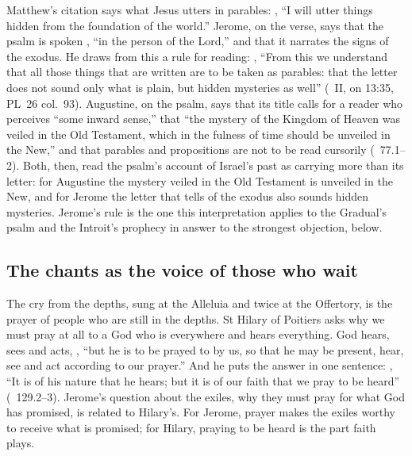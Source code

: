 Matthew's citation says what Jesus utters in parables: , ``I will utter things hidden from the foundation of
the world.'' Jerome, on the verse, says that the psalm is spoken , ``in the person of the Lord,'' and that it narrates the signs
of the exodus. He draws from this a rule for reading: , ``From this
we understand that all those things that are written are to be taken as
parables: that the letter does not sound only what is plain, but hidden
mysteries as well'' (~II, on 13:35, PL~26 col.~93).
Augustine, on the psalm, says that its title calls for a reader who perceives ``some inward sense,''
that ``the mystery of the Kingdom of Heaven was veiled in the Old Testament,
which in the fulness of time should be unveiled in the New,'' and that
parables and propositions are not to be read cursorily (~77.1--2). Both, then, read the psalm's account of Israel's past as
carrying more than its letter: for Augustine the mystery veiled in the Old
Testament is unveiled in the New, and for Jerome the letter that tells of the
exodus also sounds hidden mysteries. Jerome's rule is the one this
interpretation applies to the Gradual's psalm and the Introit's prophecy in
answer to the strongest objection, below.

\subsection{The chants as the voice of those who wait}
\label{sec:awaited-chants}

The cry from the depths, sung at the Alleluia and twice at the Offertory, is
the prayer of people who are still in the depths. St Hilary of Poitiers asks
why we must pray at all to a God who is everywhere and hears everything. God
hears, sees and acts, , ``but he is to be prayed to by us,
so that he may be present, hear, see and act according to our prayer.'' And
he puts the answer in one sentence: , ``It is of his nature that he hears;
but it is of our faith that we pray to be heard'' (~129.2--3). Jerome's question about the exiles, why they must pray for
what God has promised, is related to Hilary's. For Jerome, prayer makes the
exiles worthy to receive what is promised; for Hilary, praying to be heard is
the part faith plays.

